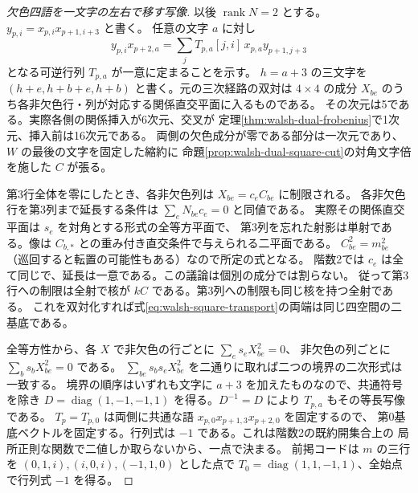 \begin{proof}[欠色四語を一文字の左右で移す写像]
以後 $\operatorname{rank}N=2$ とする。$y_{p,i}=x_{p,i}x_{p+1,i+3}$ と書く。
任意の文字 $a$ に対し
\[
 y_{p,i}x_{p+2,a}=\sum_j T_{p,a}[j,i]\,x_{p,a}y_{p+1,j+3}
 \tag{*}\label{eq:walsh-square-transport}
\]
となる可逆行列 $T_{p,a}$ が一意に定まることを示す。
$h=a+3$ の三文字を $(h+e,h+b+e,h+b)$ と書く。元の三次経路の双対は
$4\times4$ の成分 $X_{be}$ のうち各非欠色行・列が対応する関係直交平面に入るものである。
その次元は5である。実際各側の関係挿入が6次元、交叉が
定理\ref{thm:walsh-dual-frobenius}で1次元、挿入前は16次元である。
両側の欠色成分が零である部分は一次元であり、$W$ の最後の文字を固定した縮約に
命題\ref{prop:walsh-dual-square-cut}の対角文字倍を施した $C$ が張る。

第3行全体を零にしたとき、各非欠色列は $X_{be}=c_e C_{be}$ に制限される。
各非欠色行を第3列まで延長する条件は $\sum_e N_{be}c_e=0$ と同値である。
実際その関係直交平面は $s_e$ を対角とする形式の全等方平面で、
第3列を忘れた射影は単射である。像は $C_{b,*}$ との重み付き直交条件で与えられる二平面である。
$C_{be}^2=m_{be}^2$（巡回すると転置の可能性もある）なので所定の式となる。
階数2では $c_e$ は全て同じで、延長は一意である。この議論は個別の成分では割らない。
従って第3行への制限は全射で核が $kC$ である。第3列への制限も同じ核を持つ全射である。
これを双対化すれば式\eqref{eq:walsh-square-transport}の両端は同じ四空間の二基底である。

全等方性から、各 $X$ で非欠色の行ごとに $\sum_e s_e X_{be}^2=0$、
非欠色の列ごとに $\sum_b s_b X_{be}^2=0$ である。
$\sum_{be}s_bs_e X_{be}^2$ を二通りに取れば二つの境界の二次形式は一致する。
境界の順序はいずれも文字に $a+3$ を加えたものなので、共通符号を除き
$D=\operatorname{diag}(1,-1,-1,1)$ を得る。$D^{-1}=D$ により $T_{p,a}$ もその等長写像である。
$T_p=T_{p,0}$ は両側に共通な語 $x_{p,0}x_{p+1,3}x_{p+2,0}$ を固定するので、
第0基底ベクトルを固定する。行列式は $-1$ である。これは階数2の既約開集合上の
局所正則な関数で二値しか取らないから、一点で決まる。
前掲コードは $m$ の三行を $(0,1,i),(i,0,i),(-1,1,0)$ とした点で
$T_0=\operatorname{diag}(1,1,-1,1)$、全始点で行列式 $-1$ を得る。
\end{proof}

